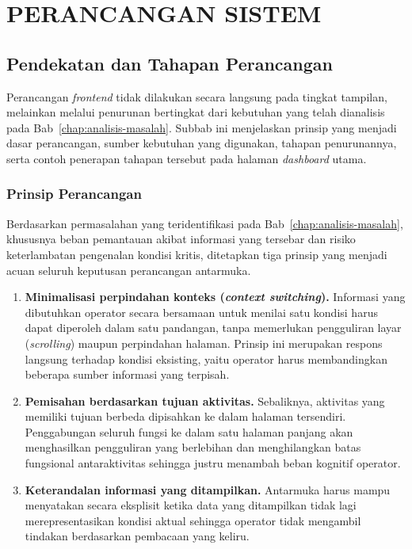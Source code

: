 \cleardoublepage
\chapter{PERANCANGAN SISTEM}
\label{chap:perancangan-sistem}
\section{Pendekatan dan Tahapan Perancangan}
\label{sec:tahapan-perancangan}

Perancangan \textit{frontend} tidak dilakukan secara langsung pada tingkat tampilan, melainkan melalui penurunan 
bertingkat dari kebutuhan yang telah dianalisis pada Bab~\ref{chap:analisis-masalah}. Subbab ini menjelaskan 
prinsip yang menjadi dasar perancangan, sumber kebutuhan yang digunakan, tahapan penurunannya, serta contoh 
penerapan tahapan tersebut pada halaman \textit{dashboard} utama.

\subsection{Prinsip Perancangan}
Berdasarkan permasalahan yang teridentifikasi pada Bab~\ref{chap:analisis-masalah}, khususnya beban pemantauan 
akibat informasi yang tersebar dan risiko keterlambatan pengenalan kondisi kritis, ditetapkan tiga prinsip yang 
menjadi acuan seluruh keputusan perancangan antarmuka.

\begin{enumerate}
    \item \textbf{Minimalisasi perpindahan konteks (\textit{context switching}).} Informasi yang dibutuhkan 
    operator secara bersamaan untuk menilai satu kondisi harus dapat diperoleh dalam satu pandangan, tanpa 
    memerlukan pengguliran layar (\textit{scrolling}) maupun perpindahan halaman. Prinsip ini merupakan respons 
    langsung terhadap kondisi eksisting, yaitu operator harus membandingkan beberapa sumber informasi yang 
    terpisah.
    
    \item \textbf{Pemisahan berdasarkan tujuan aktivitas.} Sebaliknya, aktivitas yang memiliki tujuan berbeda 
    dipisahkan ke dalam halaman tersendiri. Penggabungan seluruh fungsi ke dalam satu halaman panjang akan 
    menghasilkan pengguliran yang berlebihan dan menghilangkan batas fungsional antaraktivitas sehingga justru 
    menambah beban kognitif operator.
    
    \item \textbf{Keterandalan informasi yang ditampilkan.} Antarmuka harus mampu menyatakan secara eksplisit 
    ketika data yang ditampilkan tidak lagi merepresentasikan kondisi aktual sehingga operator tidak mengambil 
    tindakan berdasarkan pembacaan yang keliru.
\end{enumerate}

